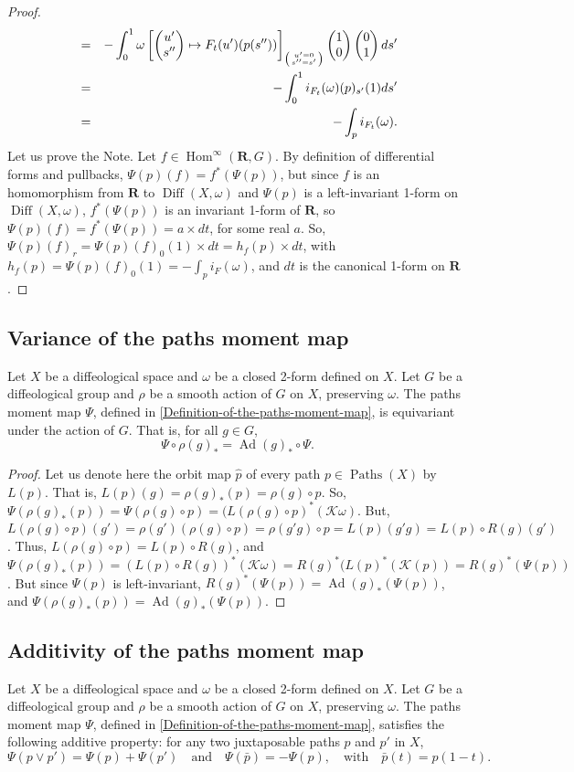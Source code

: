 \documentclass[10pt,reqno,twoside]{amsart}
\newcommand{\qmbox}[1]{\quad\mbox{#1}\quad}
\newcommand{\mymatrix}[1]{\begin{pmatrix} #1 \end{pmatrix}}
\newcommand{\RR}{\mathbf{R}}
\newcommand{\cK}{\mathcal{K}}
\DeclareMathOperator{\Diff}{Diff}
\DeclareMathOperator{\Hom}{Hom}
\DeclareMathOperator{\Ad}{Ad}
\DeclareMathOperator{\Paths}{Paths}
\newcommand{\R}{R}
\renewcommand{\L}{L}
\theoremstyle{plain}
\theoremstyle{definition}
\newcommand{\article}[1]{\subsection{#1}}
\begin{document}
\begin{proof}
\begin{eqnarray*}
      &=& - \int_0^1 \omega \left[ \mymatrix{u' \cr s''} \mapsto F_t(u')(p(s'')) \right]_{\left({u'=0 \atop s''=s'}\right)}\mymatrix{1 \cr 0} \mymatrix{0 \cr 1} ds' \\
      &=& - \int_0^1 i_{F_t}(\omega)(p)_{s'}(1) ds' \\
      &=& - \int_p i_{F_t}(\omega).
    \end{eqnarray*}
    Let us prove the Note.
    Let $f \in \Hom^\infty(\RR,G)$.
    By definition of differential forms and pullbacks,
    $\Psi(p)(f) = f^*(\Psi(p))$,
    but since $f$ is an homomorphism from $\RR$ to $\Diff(X,\omega)$ and $\Psi(p)$ is a left-invariant 1-form on $\Diff(X,\omega)$,
    $f^*(\Psi(p))$ is an invariant 1-form of $\RR$,
    so $\Psi(p)(f) = f^*(\Psi(p)) = a \times dt$,
    for some real $a$.
    So,
    $\Psi(p)(f)_r = \Psi(p)(f)_0(1) \times dt = h_f(p) \times dt$,
    with $h_f(p) = \Psi(p)(f)_0(1) = -\int_p i_F(\omega)$,
    and $dt$ is the canonical 1-form on $\RR$.
  \end{proof}
  
  \article{Variance of the paths moment map}
  \label{Variance-of-the-paths-moment-map}
  Let $X$ be a diffeological space and $\omega$ be a closed 2-form defined on $X$.
  Let $G$ be a diffeological group and $\rho$ be a smooth action of $G$ on $X$,
  preserving $\omega.$ The paths moment map $\Psi$,
  defined in \ref{Definition-of-the-paths-moment-map},
  is equivariant under the action of $G$.
  That is,
  for all $g \in G$,
  $$
    \Psi \circ \rho(g)_* = \Ad(g)_* \circ \Psi.
    $$
  
  \begin{proof}
    Let us denote here the orbit map $\hat p$ of every path $p \in \Paths(X)$ by $\L(p)$.
    That is,
    $\L(p)(g) = \rho(g)_*(p) = \rho(g) \circ p$.
    So,
    $\Psi(\rho(g)_*(p)) = \Psi(\rho(g) \circ p) = (\L(\rho(g) \circ p)^*(\cK\omega)$.
    But,
    $\L(\rho(g) \circ p)(g') = \rho(g')(\rho(g) \circ p) = \rho(g'g)\circ p = \L(p)(g'g) = \L(p)\circ \R(g)(g')$.
    Thus,
    $\L(\rho(g) \circ p) = \L(p)\circ \R(g)$,
    and $\Psi(\rho(g)_*(p)) = (\L(p) \circ \R(g))^*(\cK\omega) = \R(g)^*(\L(p)^*(\cK(p)) = \R(g)^*(\Psi(p))$.
    But since $\Psi(p)$ is left-invariant,
    $\R(g)^*(\Psi(p)) = \Ad(g)_*(\Psi(p))$,
    and $\Psi(\rho(g)_*(p)) = \Ad(g)_*(\Psi(p))$.
  \end{proof}
  
  \article{Additivity of the paths moment map}
  \label{Additivity-of-the-paths-moment-map}
  Let $X$ be a diffeological space and $\omega$ be a closed 2-form defined on $X$.
  Let $G$ be a diffeological group and $\rho$ be a smooth action of $G$ on $X$,
  preserving $\omega$.
  The paths moment map $\Psi$,
  defined in \ref{Definition-of-the-paths-moment-map},
  satisfies the following additive property:
  for any two juxtaposable paths $p$ and $p'$ in $X$,
  $$
    \Psi( p \vee p') = \Psi(p) + \Psi(p') \qmbox{and} \Psi(\bar p) = - \Psi(p), \qmbox{with} \bar p (t) = p(1-t).
    $$
  
\end{document}
